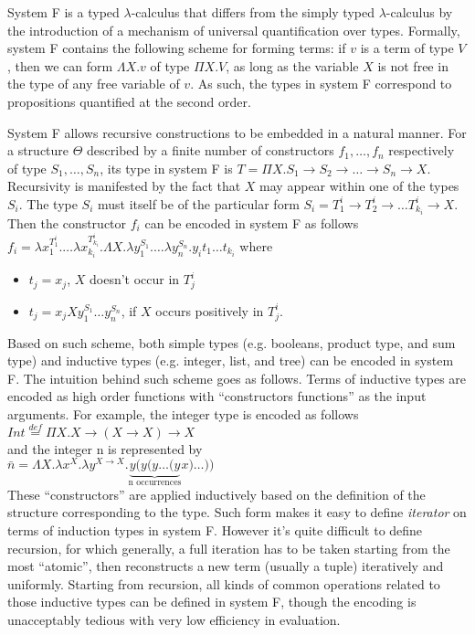 \documentclass{llncs}
\begin{document}
System F is a typed $\lambda$-calculus that differs from the
simply typed $\lambda$-calculus by the introduction of a mechanism of universal
quantification over types. Formally, system F contains the following scheme for
forming terms: if $v$ is a term of type $V$, then we can form
$\Lambda X.v$ of type $\Pi X.V$, as long as the variable $X$ is not free in the
type of any free variable of $v$. As such, the types in system F correspond to
propositions quantified at the second order.

System F allows recursive constructions to be embedded in a natural manner. For
a structure $\Theta$ described by a finite number of constructors $f_1, \dots,
f_n$ respectively of type $S_1, \dots, S_n$, its type in system F is 
$T=\Pi X.S_1 \rightarrow S_2 \rightarrow \dots \rightarrow S_n \rightarrow X$. Recursivity
is manifested by the fact that $X$ may appear within one of the types $S_i$. The
type $S_i$ must itself be of the particular form $S_i = T^i_1 \rightarrow T^i_2 \rightarrow \dots T^i_{k_i} \rightarrow X$. Then the
constructor $f_i$ can be encoded in system F as follows \\
$f_i = \lambda x_1^{T^i_1}. \dots \lambda x_{k_i}^{T^i_{k_i}}. 
\Lambda X. \lambda y^{S_1}_1. \dots \lambda y^{S_n}_n. y_i t_1\dots t_{k_i}$
where 
\begin{itemize}
\item  $t_j = x_j$, $X$ doesn't occur in $T^i_j$
\item  $t_j = x_j X y^{S_1}_1 \dots y^{S_n}_n$, if $X$ occurs positively in
$T^i_j$.

\end{itemize}

Based on such scheme, both simple types (e.g. booleans, product type, and sum
type) and inductive types (e.g. integer, list, and tree) can be encoded in
system F. The intuition behind such scheme goes as follows. Terms of inductive
types are encoded as high order functions with ``constructors functions'' as 
the input arguments. For example, the integer type is encoded as follows \\
$Int \overset{def} = \Pi X.X \rightarrow (X \rightarrow X) \rightarrow X$
\\ and the integer n is represented by \\
$\bar{n} = \Lambda X.\lambda x^X.\lambda y^{X \rightarrow X}.
\underbrace{y(y(y\dots(y}_\text{n occurrences} x)\dots))$ \\
These ``constructors'' are applied inductively based on the definition of the
structure corresponding to the type. Such form makes it easy to
define \emph{iterator} on terms of induction types in system F. However it's quite
difficult to define recursion, for which generally, a full iteration has to be taken
starting from the most ``atomic'', then reconstructs a new term (usually a
tuple) iteratively and uniformly. Starting from recursion, all kinds of common operations
related to those inductive types can be defined in system F, though the encoding
is unacceptably tedious with very low efficiency in evaluation.
\end{document}
